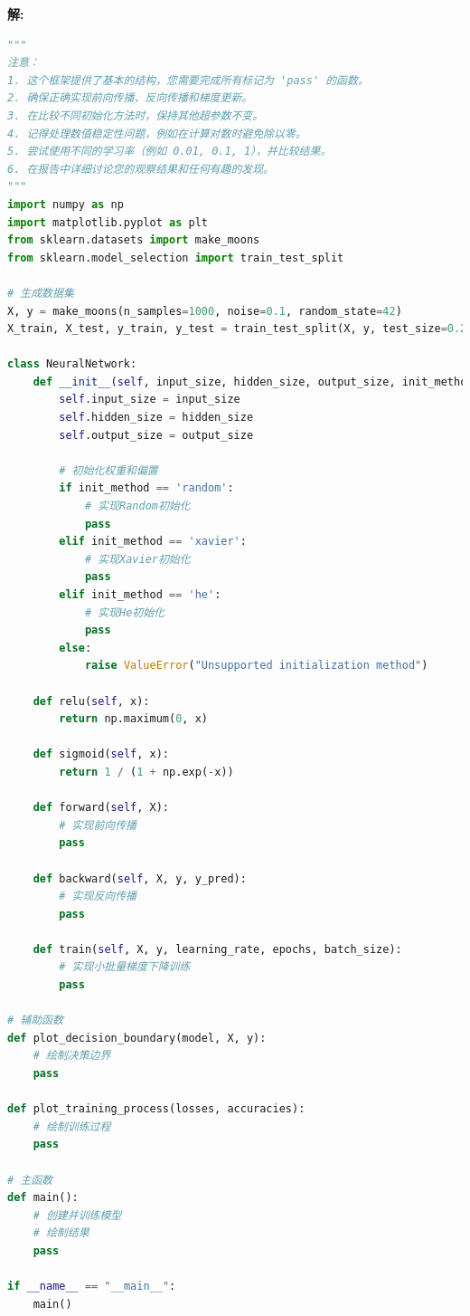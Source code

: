 \documentclass[8pt]{article}
\begin{document}
\textbf{\large 解:}
\begin{lstlisting}[breaklines=true, language=Python, caption=代码实现模板]
"""
注意：
1. 这个框架提供了基本的结构，您需要完成所有标记为 'pass' 的函数。
2. 确保正确实现前向传播、反向传播和梯度更新。
3. 在比较不同初始化方法时，保持其他超参数不变。
4. 记得处理数值稳定性问题，例如在计算对数时避免除以零。
5. 尝试使用不同的学习率（例如 0.01, 0.1, 1），并比较结果。
6. 在报告中详细讨论您的观察结果和任何有趣的发现。
"""
import numpy as np
import matplotlib.pyplot as plt
from sklearn.datasets import make_moons
from sklearn.model_selection import train_test_split

# 生成数据集
X, y = make_moons(n_samples=1000, noise=0.1, random_state=42)
X_train, X_test, y_train, y_test = train_test_split(X, y, test_size=0.2, random_state=42)

class NeuralNetwork:
    def __init__(self, input_size, hidden_size, output_size, init_method='random'):
        self.input_size = input_size
        self.hidden_size = hidden_size
        self.output_size = output_size
        
        # 初始化权重和偏置
        if init_method == 'random':
            # 实现Random初始化
            pass
        elif init_method == 'xavier':
            # 实现Xavier初始化
            pass
        elif init_method == 'he':
            # 实现He初始化
            pass
        else:
            raise ValueError("Unsupported initialization method")

    def relu(self, x):
        return np.maximum(0, x)

    def sigmoid(self, x):
        return 1 / (1 + np.exp(-x))

    def forward(self, X):
        # 实现前向传播
        pass

    def backward(self, X, y, y_pred):
        # 实现反向传播
        pass

    def train(self, X, y, learning_rate, epochs, batch_size):
        # 实现小批量梯度下降训练
        pass

# 辅助函数
def plot_decision_boundary(model, X, y):
    # 绘制决策边界
    pass

def plot_training_process(losses, accuracies):
    # 绘制训练过程
    pass

# 主函数
def main():
    # 创建并训练模型
    # 绘制结果
    pass

if __name__ == "__main__":
    main()
\end{lstlisting}
\end{document}
